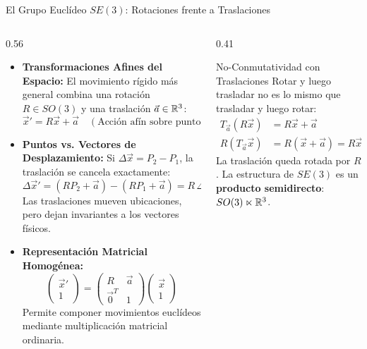 \documentclass[10pt,aspectratio=169]{beamer}
\begin{document}
\begin{frame}{El Grupo Euclídeo $SE(3)$: Rotaciones frente a Traslaciones}
  \begin{columns}[c]
    \begin{column}{0.56\textwidth}
      \footnotesize
      \begin{itemize}\itemsep2pt
        \item \textbf{Transformaciones Afines del Espacio:}
        El movimiento rígido más general combina una rotación $R \in SO(3)$ y una traslación $\vec{a} \in \mathbb{R}^3$:
        \[
        \vec{x}' = R\vec{x} + \vec{a} \quad (\text{Acción afín sobre puntos})
        \]
        \item \textbf{Puntos vs. Vectores de Desplazamiento:}
        Si $\Delta\vec{x} = P_2 - P_1$, la traslación se cancela exactamente:
        \[
        \Delta\vec{x}' = (R P_2 + \vec{a}) - (R P_1 + \vec{a}) = R\,\Delta\vec{x}.
        \]
        Las traslaciones mueven ubicaciones, pero dejan invariantes a los vectores físicos.
        \item \textbf{Representación Matricial Homogénea:}
        \[
        \begin{pmatrix} \vec{x}' \\ 1 \end{pmatrix} = \begin{pmatrix} R & \vec{a} \\ \vec{0}^T & 1 \end{pmatrix} \begin{pmatrix} \vec{x} \\ 1 \end{pmatrix}
        \]
        Permite componer movimientos euclídeos mediante multiplicación matricial ordinaria.
      \end{itemize}
    \end{column}
    \begin{column}{0.41\textwidth}
      \footnotesize
      \begin{block}{No-Conmutatividad con Traslaciones}
        \scriptsize
        Rotar y luego trasladar no es lo mismo que trasladar y luego rotar:
        \begin{align*}
          T_{\vec{a}}(R\vec{x}) &= R\vec{x} + \vec{a} \\
          R(T_{\vec{a}}\vec{x}) &= R(\vec{x} + \vec{a}) = R\vec{x} + R\vec{a}
        \end{align*}
        La traslación queda rotada por $R$. La estructura de $SE(3)$ es un \textbf{producto semidirecto}: $SO(3) \ltimes \mathbb{R}^3$.
      \end{block}
    \end{column}
  \end{columns}
\end{frame}
\end{document}
